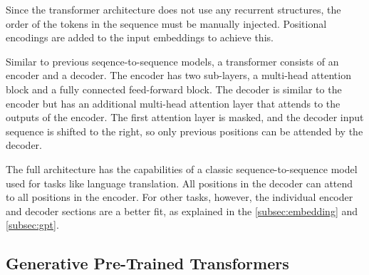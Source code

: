 \documentclass[../main.tex]{subfiles}
\begin{document}
Since the transformer architecture does not use any recurrent structures,
the order of the tokens in the sequence must be manually injected.
Positional encodings are added to the input embeddings to achieve this.

Similar to previous seqence-to-sequence models,
a transformer consists of an encoder and a decoder.
The encoder has two sub-layers,
a multi-head attention block
and a fully connected feed-forward block.
The decoder is similar to the encoder
but has an additional multi-head attention layer
that attends to the outputs of the encoder.
The first attention layer is masked,
and the decoder input sequence is shifted to the right,
so only previous positions can be
attended by the decoder.

The full architecture has the capabilities of a classic sequence-to-sequence model
used for tasks like language translation.
All positions in the decoder can attend to all positions in the encoder.
For other tasks, however,
the individual encoder and decoder sections are a better fit,
as explained in the \autoref{subsec:embedding} and \autoref{subsec:gpt}.

\subsection{Generative Pre-Trained Transformers}
\label{subsec:gpt}
\end{document}
